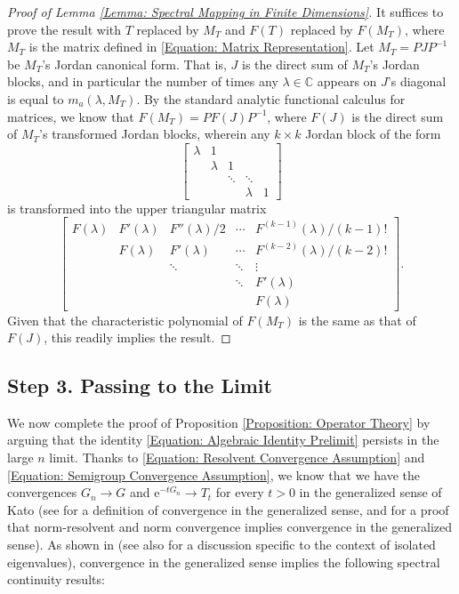 \documentclass{amsart}
\numberwithin{equation}{section}
\theoremstyle{definition}
\newcommand\la{\lambda}
\newcommand\mbb{\mathbb}
\newcommand\mr{\mathrm}
\begin{document}
%


\begin{proof}[Proof of Lemma \ref{Lemma: Spectral Mapping in Finite Dimensions}]
It suffices to prove the result with $T$ replaced by $M_T$
and $F(T)$ replaced by $F(M_T)$, where $M_T$ is the
matrix defined in \eqref{Equation: Matrix Representation}.
Let $M_T=PJP^{-1}$ be $M_T$'s Jordan canonical form. That is,
$J$ is the direct sum of $M_T$'s Jordan blocks, and in particular the number of times
any $\la\in\mbb C$ appears on $J$'s diagonal is equal to
$m_a(\la,M_T)$. By the standard analytic functional calculus for matrices,
we know that $F(M_T)=PF(J)P^{-1}$, where $F(J)$ is the direct sum
of $M_T$'s transformed Jordan blocks, wherein any $k\times k$ Jordan block
of the form
\[\left[\begin{array}{ccccc}\la&1\\
&\la&1\\
&&\ddots&\ddots\\
&&&\la&1\end{array}\right]\]
is transformed into the upper triangular matrix
\[\left[\begin{array}{ccccc}F(\la)&F'(\la)&F''(\la)/2&\cdots&F^{(k-1)}(\la)/(k-1)!\\
&F(\la)&F'(\la)&\cdots&F^{(k-2)}(\la)/(k-2)!\\
&&\ddots&\ddots&\vdots\\
&&&\ddots&F'(\la)\\
&&&&F(\la)\end{array}\right].\]
Given that the characteristic polynomial of $F(M_T)$ is the same as that of $F(J)$,
this readily implies the result.
\end{proof}

%

\subsection{Step 3. Passing to the Limit}

%

We now complete the proof of Proposition \ref{Proposition: Operator Theory}
by arguing that the identity \eqref{Equation: Algebraic Identity Prelimit} persists
in the large $n$ limit.
Thanks to \eqref{Equation: Resolvent Convergence Assumption}
and \eqref{Equation: Semigroup Convergence Assumption}, we know that we have the convergences
$G_n\to G$ and $\mr e^{-t G_n}\to T_t$ for every $t>0$ in the generalized sense of Kato
(see \cite[Chapter IV, (2.9), (2.20) and p. 206]{Kato} for a definition of convergence in the
generalized sense, and \cite[Chapter IV, Theorems 2.23 a) and 2.25]{Kato} for a proof
that norm-resolvent and norm convergence implies convergence in the generalized sense).
As shown in \cite[Chapter IV, Theorem 3.16]{Kato} (see also \cite[Chapter IV, Section 5]{Kato}
for a discussion specific to the context of isolated eigenvalues),
convergence in the generalized sense implies the following spectral continuity results:
\end{document}
